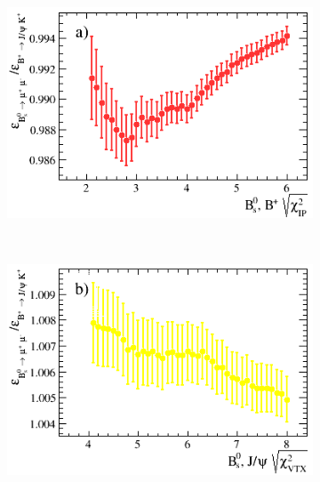 \begin{figure}[tbp]
    \centering
    \begin{subfigure}[b]{0.48\textwidth}
        \includegraphics[width=\textwidth]{./Figs/Selection/BsMuMu_JPsiK_IP.png}
        \label{fig:IPS_ratio}
    \end{subfigure}
    ~ %
    \begin{subfigure}[b]{0.48\textwidth}
        \includegraphics[width=\textwidth]{./Figs/Selection/BsMuMu_JpsiK_vertex.png}
        \label{fig:CHI2_ratio}
    \end{subfigure}
    ~ %


\end{figure}
